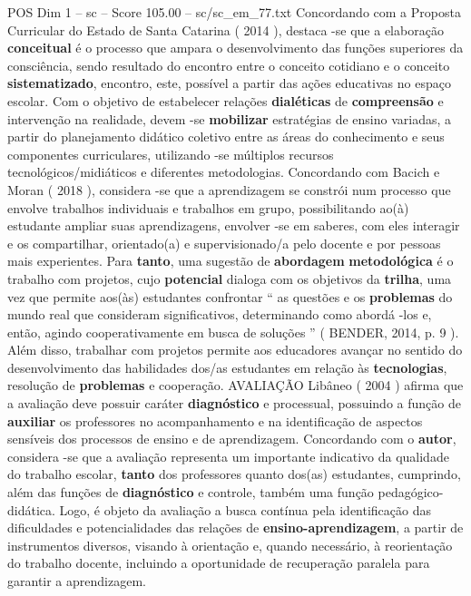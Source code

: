 \begin{textsample}{POS Dim 1 – sc – Score 105.00 – sc/sc\_em\_77.txt}
Concordando com a Proposta Curricular do Estado de Santa Catarina ( 2014 ), destaca -se que a elaboração \textbf{conceitual} é o processo que ampara o desenvolvimento das funções superiores da consciência, sendo resultado do encontro entre o conceito cotidiano e o conceito \textbf{sistematizado}, encontro, este, possível a partir das ações educativas no espaço escolar.
Com o objetivo de estabelecer relações \textbf{dialéticas} de \textbf{compreensão} e intervenção na realidade, devem -se \textbf{mobilizar} estratégias de ensino variadas, a partir do planejamento didático coletivo entre as áreas do conhecimento e seus componentes curriculares, utilizando -se múltiplos recursos tecnológicos/midiáticos e diferentes metodologias.
Concordando com Bacich e Moran ( 2018 ), considera -se que a aprendizagem se constrói num processo que envolve trabalhos individuais e trabalhos em grupo, possibilitando ao(à) estudante ampliar suas aprendizagens, envolver -se em saberes, com eles interagir e os compartilhar, orientado(a) e supervisionado/a pelo docente e por pessoas mais experientes.
Para \textbf{tanto}, uma sugestão de \textbf{abordagem} \textbf{metodológica} é o trabalho com projetos, cujo \textbf{potencial} dialoga com os objetivos da \textbf{trilha}, uma vez que permite aos(às) estudantes confrontar “ as questões e os \textbf{problemas} do mundo real que consideram significativos, determinando como abordá -los e, então, agindo cooperativamente em busca de soluções ” ( BENDER, 2014, p. 9 ).
Além disso, trabalhar com projetos permite aos educadores avançar no sentido do desenvolvimento das habilidades dos/as estudantes em relação às \textbf{tecnologias}, resolução de \textbf{problemas} e cooperação.
AVALIAÇÃO Libâneo ( 2004 ) afirma que a avaliação deve possuir caráter \textbf{diagnóstico} e processual, possuindo a função de \textbf{auxiliar} os professores no acompanhamento e na identificação de aspectos sensíveis dos processos de ensino e de aprendizagem.
Concordando com o \textbf{autor}, considera -se que a avaliação representa um importante indicativo da qualidade do trabalho escolar, \textbf{tanto} dos professores quanto dos(as) estudantes, cumprindo, além das funções de \textbf{diagnóstico} e controle, também uma função pedagógico-didática.
Logo, é objeto da avaliação a busca contínua pela identificação das dificuldades e potencialidades das relações de \textbf{ensino-aprendizagem}, a partir de instrumentos diversos, visando à orientação e, quando necessário, à reorientação do trabalho docente, incluindo a oportunidade de recuperação paralela para garantir a aprendizagem.

\end{textsample}
